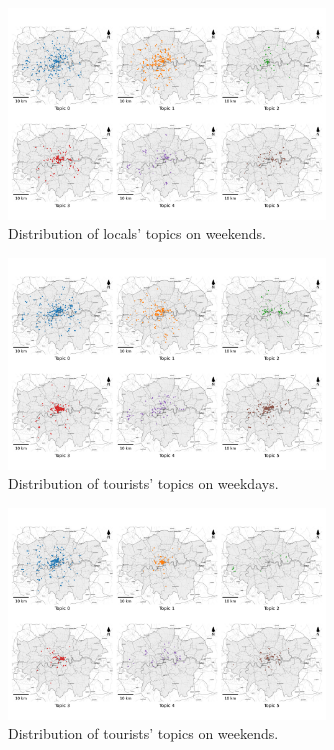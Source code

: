 \documentclass{article}
\theoremstyle{remark}
\begin{document}
\begin{figure}[!h]
\centering
\includegraphics[width=0.75\textwidth]{figures/topics_distribution_weekend_locals.png}
\caption{\label{fig:topics_distribution_weekend_locals}Distribution of locals' topics on weekends.}
\end{figure}

\begin{figure}[!h]
\centering
\includegraphics[width=0.75\textwidth]{figures/topics_distribution_weekday_tourists.png}
\caption{\label{fig:topics_distribution_weekday_tourists}Distribution of tourists' topics on weekdays.}
\end{figure}

\begin{figure}[!h]
\centering
\includegraphics[width=0.75\textwidth]{figures/topics_distribution_weekend_tourists.png}
\caption{\label{fig:topics_distribution_weekend_tourists}Distribution of tourists' topics on weekends.}
\end{figure}
\end{document}
